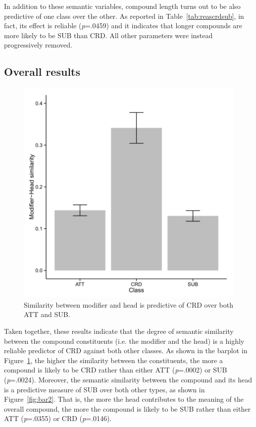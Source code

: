 \documentclass[output=paper]{langsci/langscibook}
\begin{document}
In addition to these semantic variables, compound length turns out to be also predictive of one class over the other. As reported in Table~\ref{tab:reascrdsub}, in fact, its effect is reliable (\emph{p}=.0459) and it indicates that longer compounds are more likely to be SUB than CRD. All other parameters were instead progressively removed.

\subsection{Overall results}

\begin{figure}[t!]
\begin{center}
\includegraphics[scale=0.9]{figures/barplot1.png}
\caption{Similarity between modifier and head is predictive of CRD over both ATT and SUB.}\label{fig:bar1}
\end{center}
\end{figure}


Taken together, these results indicate that the degree of semantic similarity between the compound constituents (i.e. the modifier and the head) is a highly reliable predictor of CRD against both other classes. As shown in the barplot in Figure~\ref{fig:bar1}, the higher the similarity between the constituents, the more a compound is likely to be CRD rather than either ATT (\emph{p}=.0002) or SUB (\emph{p}=.0024). Moreover, the semantic similarity between the compound and its head is a predictive measure of SUB over both other types, as shown in Figure~\ref{fig:bar2}. That is, the more the head contributes to the meaning of the overall compound, the more the compound is likely to be SUB rather than either ATT (\emph{p}=.0355) or CRD (\emph{p}=.0146).
\end{document}
